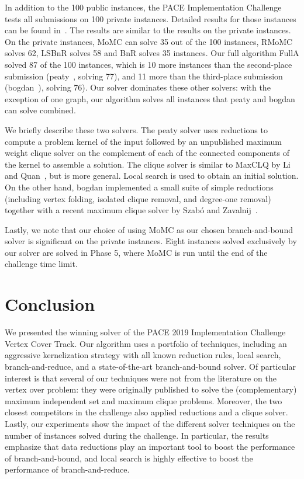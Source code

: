 \documentclass[twoside,leqno,twocolumn]{article}
\newcommand{\AlgName}[1]{\textsf{#1}}
\begin{document}
In addition to the 100 public instances, the PACE Implementation Challenge tests all submissions on 100 private instances. Detailed results for those instances can be found in~\cite{PACETR}. The results are similar to the results on the private instances. %
On the private instances, \AlgName{MoMC} can solve 35 out of the 100 instances, \AlgName{RMoMC} solves 62, \AlgName{LSBnR} solves 58 and \AlgName{BnR} solves 35 instances.
Our full algorithm \AlgName{FullA} solved 87 of the 100 instances, which is 10 more instances than the second-place submission (\textsf{peaty}~\cite{james_trimble_2019_3082356}, solving 77), and 11 more than the third-place submission (\textsf{bogdan}~\cite{zbogdan_2019_3228802}), solving 76). Our solver dominates these other solvers: with the exception of one graph, our algorithm solves all instances that \textsf{peaty} and \textsf{bogdan} can solve combined. 

We briefly describe these two solvers. The \textsf{peaty} solver uses reductions to compute a problem kernel of the input followed by an unpublished maximum weight clique solver on the complement of each of the connected components of the kernel to assemble a solution. The clique solver is similar to MaxCLQ by Li and Quan~\cite{DBLP:conf/aaai/LiQ10}, but is more general. Local search is used to obtain an initial solution. On the other hand, \textsf{bogdan} implemented a small suite of simple reductions (including vertex folding, isolated clique removal, and degree-one removal) together with a recent maximum clique solver by Szab\'o and Zavalnij~\cite{szabo2018different}. 

Lastly, we note that our choice of using MoMC as our chosen branch-and-bound solver is significant on the private instances. Eight instances solved exclusively by our solver are solved in Phase 5, where MoMC is run until the end of the challenge time limit.
\section{Conclusion}
We presented the winning solver of the PACE 2019 Implementation Challenge Vertex Cover Track. Our algorithm uses a portfolio of techniques, including an aggressive kernelization strategy with all known reduction rules, local search, branch-and-reduce, and a state-of-the-art branch-and-bound solver. Of particular interest is that several of our techniques were not from the literature on the vertex over problem: they were originally published to solve the (complementary) maximum independent set and maximum clique problems. Moreover, the two closest competitors in the challenge also applied reductions and a clique solver. Lastly, our experiments show the impact of the different solver techniques on the number of instances solved during the challenge. In particular, the results emphasize that data reductions play an important tool to boost the performance of branch-and-bound, and local search is highly effective to boost the performance of branch-and-reduce.
\end{document}

